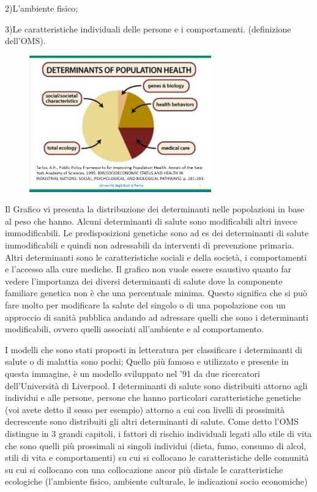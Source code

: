 2)L'ambiente fisico;

3)Le caratteristiche individuali delle persone e i comportamenti.
(definizione dell'OMS).

\begin{figure}[!ht]
\centering
	\includegraphics[width=0.7\textwidth]{17/image1.png}
	\end{figure}

Il Grafico vi presenta la distribuzione dei determinanti nelle
popolazioni in base al peso che hanno. Alcuni determinanti di salute
sono modificabili altri invece immodificabili. Le predisposizioni
genetiche sono ad es dei determinanti di salute immodificabili e quindi
non adressabili da interventi di prevenzione primaria. Altri
determinanti sono le caratteristiche sociali e della società, i
comportamenti e l'accesso alla cure mediche. Il grafico non vuole essere
esaustivo quanto far vedere l'importanza dei diversi determinanti di
salute dove la componente familiare genetica non è che una percentuale
minima. Questo significa che si può fare molto per modificare la salute
del singolo o di una popolazione con un approccio di sanità pubblica
andando ad adressare quelli che sono i determinanti modificabili, ovvero
quelli associati all'ambiente e al comportamento.

I modelli che sono stati proposti in letteratura per classificare i
determinanti di salute o di malattia sono pochi; Quello più famoso e
utilizzato e presente in questa immagine, è un modello sviluppato nel
'91 da due ricercatori dell'Università di Liverpool. I determinanti di
salute sono distribuiti attorno agli individui e alle persone, persone
che hanno particolari caratteristiche genetiche (voi avete detto il
sesso per esempio) attorno a cui con livelli di prossimità decrescente
sono distribuiti gli altri determinanti di salute. Come detto l'OMS
distingue in 3 grandi capitoli, i fattori di rischio individuali legati
allo stile di vita che sono quelli più prossimali ai singoli individui
(dieta, fumo, consumo di alcol, stili di vita e comportamenti) su cui si
collocano le caratteristiche delle comunità su cui si collocano con una
collocazione ancor più distale le caratteristiche ecologiche (l'ambiente
fisico, ambiente culturale, le indicazioni socio economiche)

